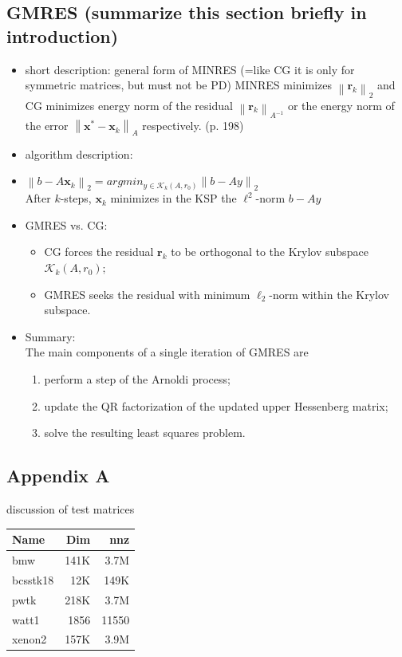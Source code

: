 \documentclass{scrartcl}
\newcommand{\norm}[1]{\left\lVert#1\right\rVert}
\begin{document}
\subsection*{GMRES (summarize this section briefly in introduction)}
\begin{itemize}
\item short description: general form of MINRES (=like CG it is only for symmetric matrices, but must not be PD) MINRES minimizes $\norm{\textbf{r}_k}_2$ and CG minimizes energy norm of the residual $\norm{\textbf{r}_k}_{A^{-1}}$ or the energy norm of the error $\norm{\textbf{x}^* - \textbf{x}_k}_A$ respectively. \cite{Ascher:2011:FCN:2031413} (p. 198)
\item algorithm description:
\item $\norm{b - A\textbf{x}_k}_2 = argmin_{y \in \mathcal{K}_k(A, r_0)}\norm{b - Ay}_2$\\
	 After $k$-steps, $\textbf{x}_k$ minimizes in the KSP the $\ell^2$-norm $b - Ay$
\item GMRES vs. CG:
\begin{itemize}
\item CG forces the residual $\textbf{r}_k$ to be orthogonal to the Krylov subspace $\mathcal{K}_k(A, r_0)$;
\item GMRES seeks the residual with minimum $\ell_2$-norm within the Krylov subspace.
\end{itemize}
\item Summary:\\
The main components of a single iteration of GMRES are
\begin{enumerate}
	\item perform a step of the Arnoldi process;
	\item update the QR factorization of the updated upper Hessenberg matrix;
	\item solve the resulting least squares problem.
	\end{enumerate}
\end{itemize}



 \listofalgorithms
\begin{appendices}
\section*{Appendix A}
discussion of test matrices \\

\begin{tabular}{l|r|r}
Name & Dim & nnz \\
\hline
bmw & 141K & 3.7M \\
bcsstk18 & 12K & 149K \\
pwtk & 218K & 3.7M \\
watt1 & 1856 & 11550 \\
xenon2 & 157K & 3.9M
\end{tabular}
\end{appendices}
\end{document}
